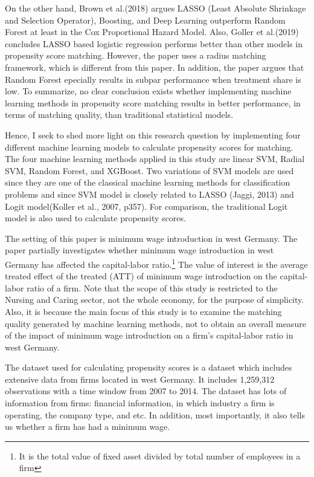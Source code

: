 \documentclass[11pt,a4paper,oneside]{article}
\begin{document}
\par
On the other hand, Brown et al.(2018)\cite{brown2018estimating} argues LASSO (Least Absolute Shrinkage and Selection Operator), Boosting, and Deep Learning outperform Random Forest at least in the Cox Proportional Hazard Model. Also, Goller et al.(2019)\cite{goller2019does} concludes LASSO based logistic regression performs better than other models in propensity score matching. However, the paper uses a radius matching framework, which is different from this paper. In addition, the paper argues that Random Forest epecially results in subpar performance when treatment share is low. To summarize, no clear conclusion exists whether implementing machine learning methods in propensity score matching results in better performance, in terms of matching quality, than traditional statistical models.
\par
Hence, I seek to shed more light on this research question by implementing four different machine learning models to calculate propensity scores for matching. The four machine learning methods applied in this study are linear SVM, Radial SVM, Random Forest, and XGBoost. Two variations of SVM models are used since they are one of the classical machine learning methods for classification problems and since SVM model is closely related to LASSO (Jaggi, 2013)\cite{jaggi2013equivalence} and Logit model(Koller et al., 2007, p357).\cite{koller2007introduction} For comparison, the traditional Logit model is also used to calculate propensity scores. 
\par
The setting of this paper is minimum wage introduction in west Germany. The paper partially investigates whether minimum wage introduction in west Germany has affected the capital-labor ratio.\footnote{It is the total value of fixed asset divided by total number of employees in a firm} The value of interest is the average treated effect of the treated (ATT) of minimum wage introduction on the capital-labor ratio of a firm. Note that the scope of this study is restricted to the Nursing and Caring sector, not the whole economy, for the purpose of simplicity. Also, it is because the main focus of this study is to examine the matching quality generated by machine learning methods, not to obtain an overall measure of the impact of minimum wage introduction on a firm's capital-labor ratio in west Germany. 
\par
The dataset used for calculating propensity scores is a dataset which includes extensive data from firms located in west Germany. It includes 1,259,312 observations with a time window from 2007 to 2014. The dataset has lots of information from firms: financial information, in which industry a firm is operating, the company type, and etc. In addition, most importantly, it also tells us whether a firm has had a minimum wage.
\end{document}
